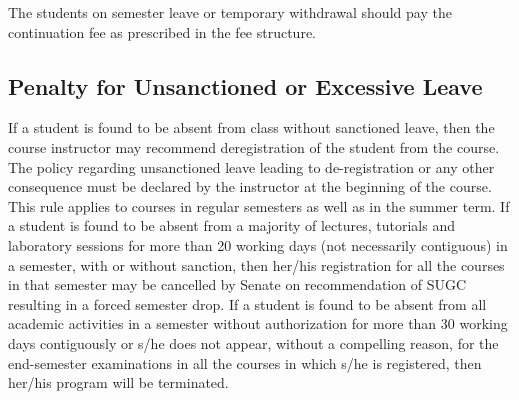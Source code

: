 The students on semester leave or temporary withdrawal should pay the continuation fee as prescribed in the fee structure.

\subsection{Penalty for Unsanctioned or Excessive Leave}

If a student is found to be absent from class without sanctioned leave, then the course instructor may recommend deregistration of the student from the course. The policy regarding unsanctioned leave leading to de-registration or any other consequence must be declared by the instructor at the beginning of the course. This rule applies to courses in regular semesters as well as in the summer term. If a student is found to be absent from a majority of lectures, tutorials and laboratory sessions for more than 20 working days (not necessarily contiguous) in a semester, with or without sanction, then her/his registration for all the courses in that semester may be cancelled by Senate on recommendation of SUGC resulting in a forced semester drop. If a student is found to be absent from all academic activities in a semester without authorization for more than 30 working days contiguously or s/he does not appear, without a compelling reason, for the end-semester examinations in all the courses in which s/he is registered, then her/his program will be terminated.